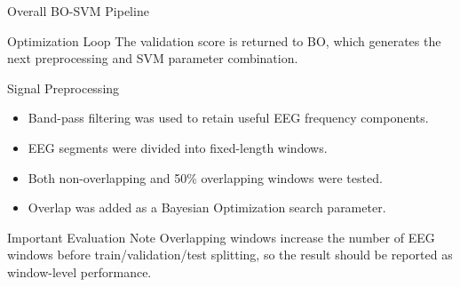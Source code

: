 \documentclass[10pt,aspectratio=169]{beamer}
\begin{document}
\begin{frame}{Overall BO-SVM Pipeline}

  \vspace{0.25cm}
  \begin{block}{Optimization Loop}
    The validation score is returned to BO, which generates the next
    preprocessing and SVM parameter combination.
  \end{block}
\end{frame}

\begin{frame}{Signal Preprocessing}
  \begin{itemize}
    \item Band-pass filtering was used to retain useful EEG frequency components.
    \item EEG segments were divided into fixed-length windows.
    \item Both non-overlapping and 50\% overlapping windows were tested.
    \item Overlap was added as a Bayesian Optimization search parameter.
  \end{itemize}

  \begin{block}{Important Evaluation Note}
    Overlapping windows increase the number of EEG windows before train/validation/test splitting, so the result should be reported as window-level performance.
  \end{block}
\end{frame}
\end{document}
